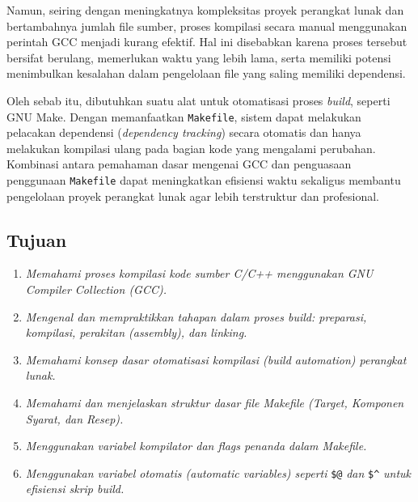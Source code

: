 Namun, seiring dengan meningkatnya kompleksitas proyek perangkat lunak dan bertambahnya jumlah file sumber, proses kompilasi secara manual menggunakan perintah GCC menjadi kurang efektif. Hal ini disebabkan karena proses tersebut bersifat berulang, memerlukan waktu yang lebih lama, serta memiliki potensi menimbulkan kesalahan dalam pengelolaan file yang saling memiliki dependensi.

Oleh sebab itu, dibutuhkan suatu alat untuk otomatisasi proses \textit{build}, seperti GNU Make. Dengan memanfaatkan \texttt{Makefile}, sistem dapat melakukan pelacakan dependensi (\textit{dependency tracking}) secara otomatis dan hanya melakukan kompilasi ulang pada bagian kode yang mengalami perubahan. Kombinasi antara pemahaman dasar mengenai GCC dan penguasaan penggunaan \texttt{Makefile} dapat meningkatkan efisiensi waktu sekaligus membantu pengelolaan proyek perangkat lunak agar lebih terstruktur dan profesional.

\subsection{Tujuan}
\label{subsec:tujuan}
\begin{enumerate}
    \item \textit{Memahami proses kompilasi kode sumber C/C++ menggunakan GNU Compiler Collection (GCC).}
    \item \textit{Mengenal dan mempraktikkan tahapan dalam proses build: preparasi, kompilasi, perakitan (assembly), dan linking.}
    \item \textit{Memahami konsep dasar otomatisasi kompilasi (build automation) perangkat lunak.}
    \item \textit{Memahami dan menjelaskan struktur dasar file Makefile (Target, Komponen Syarat, dan Resep).}
    \item \textit{Menggunakan variabel kompilator dan flags penanda dalam Makefile.}
    \item \textit{Menggunakan variabel otomatis (automatic variables) seperti} \verb|$@| \textit{dan} \verb|$^| \textit{untuk efisiensi skrip build.}
\end{enumerate}

